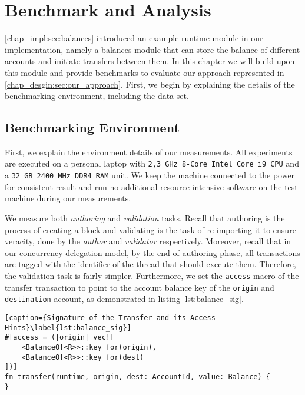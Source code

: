 \chapter{Benchmark and Analysis}  \label{chap:bench_analysis}



\ref{chap_impl:sec:balances} introduced an example runtime module in our implementation, namely a
balances module that can store the balance of different accounts and initiate transfers between
them. In this chapter we will build upon this module and provide benchmarks to evaluate our approach
represented in \ref{chap_desgin:sec:our_approach}. First, we begin by explaining the details of the
benchmarking environment, including the data set.

\section{Benchmarking Environment}

First, we explain the environment details of our measurements. All experiments are executed on a
personal laptop with \texttt{2,3 GHz 8-Core Intel Core i9 CPU} and a \texttt{32 GB 2400 MHz DDR4
RAM} unit. We keep the machine connected to the power for consistent result and run no additional
resource intensive software on the test machine during our measurements.

We measure both \textit{authoring} and \textit{validation} tasks. Recall that authoring is the
process of creating a block and validating is the task of re-importing it to ensure veracity, done
by the \textit{author} and \textit{validator} respectively. Moreover, recall that in our concurrency
delegation model, by the end of authoring phase, all transactions are tagged with the identifier of
the thread that should execute them. Therefore, the validation task is fairly simpler. Furthermore,
we set the \texttt{access} macro of the transfer transaction to point to the account balance key of
the \texttt{origin} and \texttt{destination} account, as demonstrated in
listing \ref{lst:balance_sig}.

\begin{lstlisting}[caption={Signature of the Transfer and its Access Hints}\label{lst:balance_sig}]
#[access = (|origin| vec![
	<BalanceOf<R>>::key_for(origin),
	<BalanceOf<R>>::key_for(dest)
])]
fn transfer(runtime, origin, dest: AccountId, value: Balance) {
}
\end{lstlisting}

